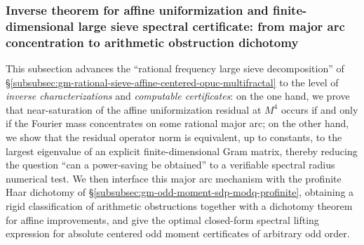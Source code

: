 \subsubsection{Inverse theorem for affine uniformization and finite-dimensional large sieve spectral certificate: from major arc concentration to arithmetic obstruction dichotomy}\label{subsubsec:gm-affine-inverse-gram-arithmetic-dichotomy}
This subsection advances the ``rational frequency large sieve decomposition'' of \S\ref{subsubsec:gm-rational-sieve-affine-centered-opuc-multifractal} to the level of \emph{inverse characterizations} and \emph{computable certificates}: on the one hand, we prove that near-saturation of the affine uniformization residual at \(M^4\) occurs if and only if the Fourier mass concentrates on some rational major arc; on the other hand, we show that the residual operator norm is equivalent, up to constants, to the largest eigenvalue of an explicit finite-dimensional Gram matrix, thereby reducing the question ``can a power-saving be obtained'' to a verifiable spectral radius numerical test. We then interface this major arc mechanism with the profinite Haar dichotomy of \S\ref{subsubsec:gm-odd-moment-sdp-modq-profinite}, obtaining a rigid classification of arithmetic obstructions together with a dichotomy theorem for affine improvements, and give the optimal closed-form spectral lifting expression for absolute centered odd moment certificates of arbitrary odd order.

